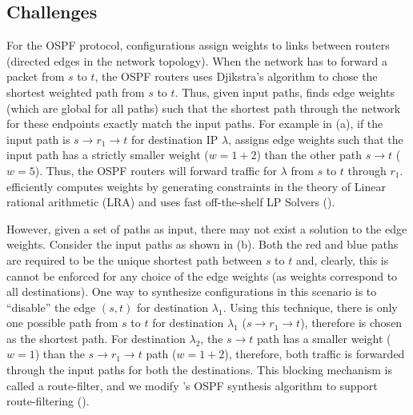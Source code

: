 \subsection{Challenges}
For the OSPF protocol, configurations assign
weights to links between routers (directed edges
in the network topology). When the network has
to forward a packet from $s$ to $t$, the
OSPF routers uses 
Djikstra's algorithm to chose the
shortest weighted path from $s$ to $t$. Thus,
given input paths, \name finds edge weights 
(which are global for all paths) such that 
the shortest path through the network
for these endpoints exactly match the input paths. 
For example in (a), if the input
path is $s\rightarrow r_1 \rightarrow t$ for
destination IP $\lambda$, \name assigns
edge weights such that the input path has a strictly
smaller weight ($w=1+2$) than the other path $s \rightarrow t$ 
($w=5$). Thus, the OSPF routers will forward traffic for
$\lambda$ from $s$ to $t$ through $r_1$. \name 
efficiently computes weights by generating constraints
in the theory of Linear rational arithmetic (LRA) and
uses fast off-the-shelf LP Solvers 
(). 

However, given a set of paths as input, there may
not exist a solution to the edge weights. Consider the 
input paths as shown in (b). 
Both the red and blue paths are required 
to be the unique shortest path between $s$ to $t$
and, clearly, this is cannot be enforced for any 
choice of the edge weights (as weights correspond 
to all destinations). 
One way to synthesize configurations in this scenario 
is to ``disable'' the edge
$(s, t)$ for destination $\lambda_1$.
Using this technique, 
there is only one possible path from $s$ to $t$
for destination $\lambda_1$ ($s\rightarrow r_1 \rightarrow t$),
therefore is chosen as the shortest path. For 
destination $\lambda_2$, the $s\rightarrow t$ path
has a smaller weight ($w=1$) than the
$s\rightarrow r_1 \rightarrow t$ path ($w=1+2$), therefore,
both traffic is forwarded through the input paths for
both the destinations. 
This blocking mechanism is called a route-filter, and
we modify \name's OSPF synthesis algorithm to support
route-filtering ().
 

